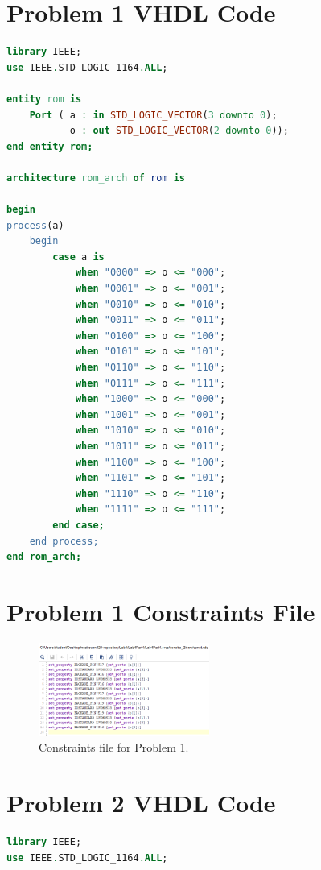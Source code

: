 \documentclass[11pt]{article}
\begin{document}
\begin{appendices}

\section{Problem 1 VHDL Code}

\begin{lstlisting}[language=VHDL]
library IEEE;
use IEEE.STD_LOGIC_1164.ALL;

entity rom is
    Port ( a : in STD_LOGIC_VECTOR(3 downto 0);
           o : out STD_LOGIC_VECTOR(2 downto 0));
end entity rom;

architecture rom_arch of rom is
    
begin
process(a)
    begin
        case a is
            when "0000" => o <= "000";
            when "0001" => o <= "001";
            when "0010" => o <= "010";
            when "0011" => o <= "011";
            when "0100" => o <= "100";
            when "0101" => o <= "101";
            when "0110" => o <= "110";
            when "0111" => o <= "111";
            when "1000" => o <= "000";
            when "1001" => o <= "001";
            when "1010" => o <= "010";
            when "1011" => o <= "011";
            when "1100" => o <= "100";
            when "1101" => o <= "101";
            when "1110" => o <= "110";
            when "1111" => o <= "111";
        end case;
    end process;
end rom_arch;
\end{lstlisting}

\section{Problem 1 Constraints File}
\begin{figure}[H]
\begin{center}
	\includegraphics[width=0.5\textwidth]{../report-images/Part1Const.png}
	\caption{\label{fig:Part1ConstFile}Constraints file for Problem 1.}
\end{center}
\end{figure}

\section{Problem 2 VHDL Code}
\begin{lstlisting}[language=VHDL]
library IEEE;
use IEEE.STD_LOGIC_1164.ALL;


\end{lstlisting}
\end{appendices}
\end{document}
